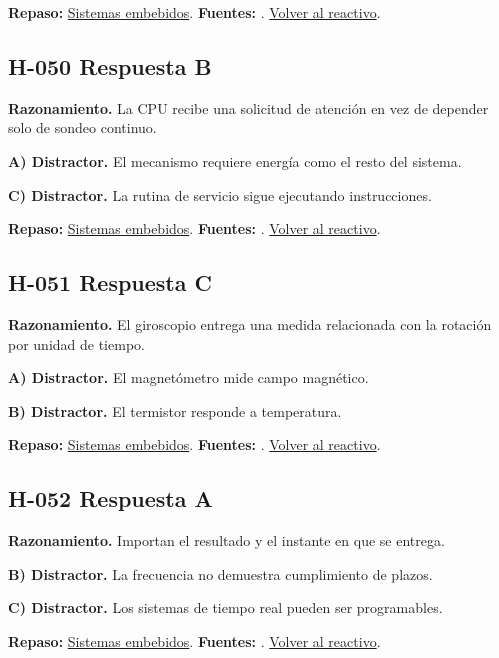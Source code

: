 \textbf{Repaso:} \hyperref[sec:h3]{Sistemas embebidos}. \textbf{Fuentes:} \cite{avr,arduino,sensors}. \hyperref[q:H-049]{Volver al reactivo}.\par\medskip

\subsection*{H-050 \quad Respuesta B}\label{s:H-050}
\textbf{Razonamiento.} La CPU recibe una solicitud de atención en vez de depender solo de sondeo continuo.

\textbf{A) Distractor. }El mecanismo requiere energía como el resto del sistema.

\textbf{C) Distractor. }La rutina de servicio sigue ejecutando instrucciones.

\textbf{Repaso:} \hyperref[sec:h3]{Sistemas embebidos}. \textbf{Fuentes:} \cite{avr,arduino,sensors}. \hyperref[q:H-050]{Volver al reactivo}.\par\medskip

\subsection*{H-051 \quad Respuesta C}\label{s:H-051}
\textbf{Razonamiento.} El giroscopio entrega una medida relacionada con la rotación por unidad de tiempo.

\textbf{A) Distractor. }El magnetómetro mide campo magnético.

\textbf{B) Distractor. }El termistor responde a temperatura.

\textbf{Repaso:} \hyperref[sec:h3]{Sistemas embebidos}. \textbf{Fuentes:} \cite{avr,arduino,sensors}. \hyperref[q:H-051]{Volver al reactivo}.\par\medskip

\subsection*{H-052 \quad Respuesta A}\label{s:H-052}
\textbf{Razonamiento.} Importan el resultado y el instante en que se entrega.

\textbf{B) Distractor. }La frecuencia no demuestra cumplimiento de plazos.

\textbf{C) Distractor. }Los sistemas de tiempo real pueden ser programables.

\textbf{Repaso:} \hyperref[sec:h3]{Sistemas embebidos}. \textbf{Fuentes:} \cite{avr,arduino,sensors}. \hyperref[q:H-052]{Volver al reactivo}.\par\medskip

